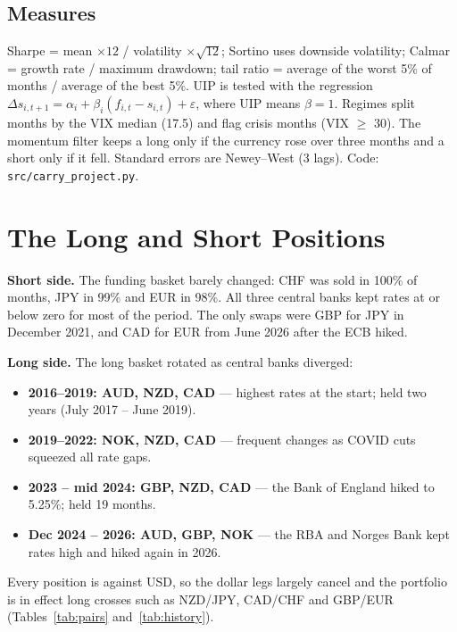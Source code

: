 \documentclass[11pt,a4paper]{article}
\begin{document}
\subsection{Measures}
Sharpe = mean $\times12$ / volatility $\times\sqrt{12}$; Sortino uses downside volatility; Calmar = growth rate / maximum
drawdown; tail ratio = average of the worst 5\% of months / average of the best 5\%. UIP is tested with the
\citet{fama1984} regression $\Delta s_{i,t+1} = \alpha_i + \beta_i (f_{i,t} - s_{i,t}) + \varepsilon$, where UIP means
$\beta = 1$. Regimes split months by the VIX median (17.5) and flag crisis months (VIX $\geq$ 30). The momentum filter keeps a
long only if the currency rose over three months and a short only if it fell. Standard errors are Newey--West (3 lags).
Code: \texttt{src/carry\_project.py}.

\section{The Long and Short Positions}
\textbf{Short side.} The funding basket barely changed: CHF was sold in 100\% of months, JPY in 99\% and EUR in 98\%. All
three central banks kept rates at or below zero for most of the period. The only swaps were GBP for JPY in December 2021,
and CAD for EUR from June 2026 after the ECB hiked.

\textbf{Long side.} The long basket rotated as central banks diverged:
\begin{itemize}\setlength{\itemsep}{0pt}
\item \textbf{2016--2019: AUD, NZD, CAD} --- highest rates at the start; held two years (July 2017 -- June 2019).
\item \textbf{2019--2022: NOK, NZD, CAD} --- frequent changes as COVID cuts squeezed all rate gaps.
\item \textbf{2023 -- mid 2024: GBP, NZD, CAD} --- the Bank of England hiked to 5.25\%; held 19 months.
\item \textbf{Dec 2024 -- 2026: AUD, GBP, NOK} --- the RBA and Norges Bank kept rates high and hiked again in 2026.
\end{itemize}
Every position is against USD, so the dollar legs largely cancel and the portfolio is in effect long crosses such as NZD/JPY,
CAD/CHF and GBP/EUR (Tables~\ref{tab:pairs} and~\ref{tab:history}).
\end{document}

